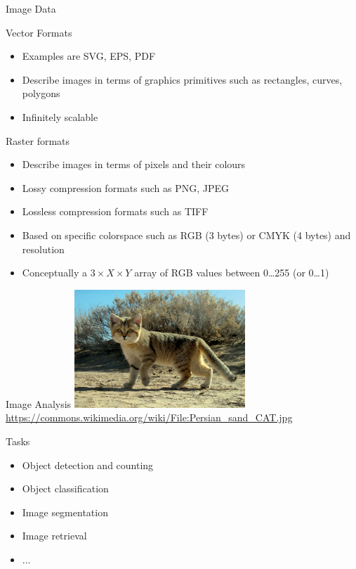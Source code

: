 \documentclass[ignorenonframetext,xcolor=x11names]{beamer}
\begin{document}
\begin{frame}{Image Data}
\begin{block}{Vector Formats}
\begin{itemize}
	\item Examples are SVG, EPS, PDF
	\item Describe images in terms of graphics primitives such as rectangles, curves, polygons
	\item Infinitely scalable
\end{itemize}
\end{block}
\begin{block}{Raster formats}
\begin{itemize}
	\item Describe images in terms of pixels and their colours
	\item Lossy compression formats such as PNG, JPEG 
	\item Lossless compression formats such as TIFF
	\item Based on specific colorspace such as RGB (3 bytes) or CMYK (4 bytes) and resolution
	\item Conceptually a $3 \times X \times Y$ array of RGB values between 0\ldots255 (or 0\ldots1)
\end{itemize}
\end{block}
\end{frame}

\begin{frame}{Image Analysis}
\centering
\includegraphics[height=1.75in]{Persian_sand_CAT.jpg} \\

\scriptsize \url{https://commons.wikimedia.org/wiki/File:Persian_sand_CAT.jpg} \normalsize

\begin{block}{Tasks}
\begin{itemize}
	\item Object detection and counting
	\item Object classification
	\item Image segmentation
	\item Image retrieval
	\item $\ldots$
\end{itemize}
\end{block}
\end{frame}
\end{document}
